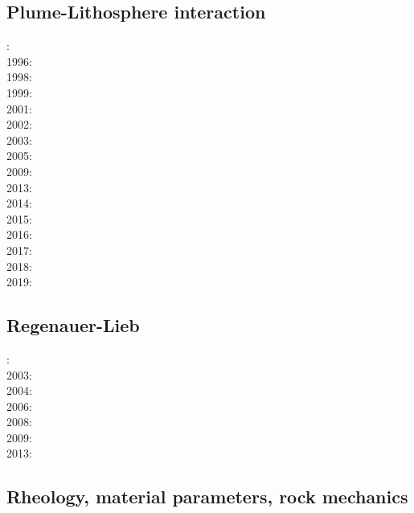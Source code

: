 \subsection*{Plume-Lithosphere interaction}

: \cite{rich94}\\
1996: \cite{zhgm96}\\
1998: \cite{bisp98}\cite{most98}\\
1999: \cite{most99}\\
2001: \cite{vapy01}\\
2002: \cite{foul02}\\
2003: \cite{vazh03}\\
2005: \cite{bugu05}\\
2009: \cite{bucl09}\cite{zhgy09}\cite{baiv10}\\
2013: \cite{bemm12}\cite{brps13}\\
2014: \cite{buge14}\cite{gery14b}\cite{buto14}\cite{buit14}\\
2015: \cite{bemm15}\cite{gesb15}\cite{kocb15}\cite{meds15}\\
2016: \cite{fige16}\cite{gadb16}\cite{kobc16}\\
2017: \cite{bahf17}\cite{brsg17}\cite{bahf17}\cite{bekb17}\cite{kocb17}\\
2018: \cite{daga18}\\
2019: \cite{kobg19}

\subsection*{Regenauer-Lieb}

: \cite{reyu00}\\
2003: \cite{reyu03}\\
2004: \cite{reyu04}\\
2006: \cite{rehy06}\cite{rewr06}\\
2008: \cite{rerw08}\\
2009: \cite{reps09}\\
2013: \cite{revp13}

\subsection*{Rheology, material parameters, rock mechanics}

